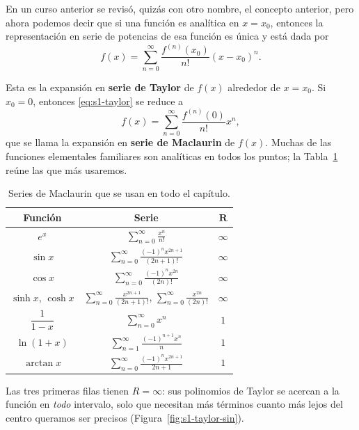 \begin{remark}
    En un curso anterior se revisó, quizás con otro nombre, el concepto anterior, pero ahora podemos decir que si una función es analítica en $x = x_0$, entonces la representación en serie de potencias de esa función es única y está dada por
\begin{equation}
f(x) = \sum_{n=0}^{\infty} \frac{f^{(n)}(x_0)}{n!} (x - x_0)^n.
\label{eq:s1-taylor}
\end{equation}
 
Esta es la expansión en \textbf{serie de Taylor} de $f(x)$ alrededor de $x = x_0$. Si $x_0 = 0$, entonces \eqref{eq:s1-taylor} se reduce a
\[ f(x) = \sum_{n=0}^{\infty} \frac{f^{(n)}(0)}{n!} x^n, \]
que se llama la expansión en \textbf{serie de Maclaurin} de $f(x)$. Muchas de las funciones elementales familiares son analíticas en todos los puntos; la Tabla~\ref{tab:s1-maclaurin} reúne las que más usaremos.
\end{remark}
 
\begin{table}[H]
\centering
\small
\caption{Series de Maclaurin que se usan en todo el capítulo.}
\label{tab:s1-maclaurin}
\begin{tabular}{|c|c|c|}
\hline
\rowcolor{bbe!15}\textbf{Función} & \textbf{Serie} & $\mathbf{R}$ \\ \hline
$e^x$ & $\displaystyle\sum_{n=0}^{\infty}\frac{x^n}{n!}$ & $\infty$ \\ \hline
$\sin x$ & $\displaystyle\sum_{n=0}^{\infty}\frac{(-1)^n x^{2n+1}}{(2n+1)!}$ & $\infty$ \\ \hline
$\cos x$ & $\displaystyle\sum_{n=0}^{\infty}\frac{(-1)^n x^{2n}}{(2n)!}$ & $\infty$ \\ \hline
$\sinh x$, $\cosh x$ & $\displaystyle\sum_{n=0}^{\infty}\frac{x^{2n+1}}{(2n+1)!}$, \quad $\displaystyle\sum_{n=0}^{\infty}\frac{x^{2n}}{(2n)!}$ & $\infty$ \\ \hline
$\dfrac{1}{1-x}$ & $\displaystyle\sum_{n=0}^{\infty}x^n$ & $1$ \\ \hline
$\ln(1+x)$ & $\displaystyle\sum_{n=1}^{\infty}\frac{(-1)^{n+1}x^n}{n}$ & $1$ \\ \hline
$\arctan x$ & $\displaystyle\sum_{n=0}^{\infty}\frac{(-1)^n x^{2n+1}}{2n+1}$ & $1$ \\ \hline
\end{tabular}
\end{table}
 
Las tres primeras filas tienen $R=\infty$: sus polinomios de Taylor se acercan a la función en \emph{todo} intervalo, solo que necesitan más términos cuanto más lejos del centro queramos ser precisos (Figura~\ref{fig:s1-taylor-sin}).
 
